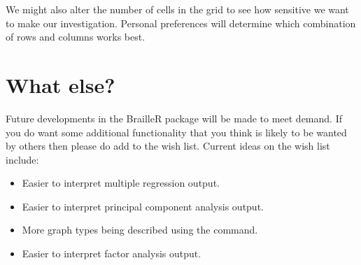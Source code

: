 We might also alter the number of cells in the grid to see how sensitive we want to make our investigation. Personal preferences will determine which combination of rows and columns works best. 
 
\section{What else?} 
 
Future developments in the BrailleR package will be made to meet demand. If you do want some additional functionality that you think is likely to be wanted by others then please do add to the wish list. Current ideas on the wish list include: 
\begin{itemize} 
\item Easier to interpret multiple regression output. 
\item Easier to interpret principal component analysis output. 
\item More graph types being described using the  command. 
\item Easier to interpret factor analysis output. 
\end{itemize} 
 
 
 


